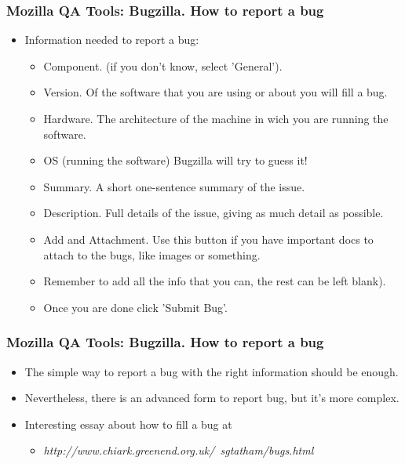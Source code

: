 \documentclass{beamer}
\begin{document}
\begin{frame}
 \frametitle{Mozilla QA Tools: Bugzilla. How to report a bug}
 \begin{itemize}
    \item Information needed to report a bug:
    \begin{itemize}
      \item Component. (if you don't know, select 'General').
      \item Version. Of the software that you are using or about you will fill a bug.
      \item Hardware. The architecture of the machine in wich you are running the software.
      \item OS (running the software) Bugzilla will try to guess it!
      \item Summary. A short one-sentence summary of the issue.
      \item Description. Full details of the issue, giving as much detail as possible.
      \item Add and Attachment. Use this button if you have important docs to attach to the bugs, like images or something.
      \item Remember to add all the info that you can, the rest can be left blank).
      \item Once you are done click 'Submit Bug'.
      \end{itemize}
 \end{itemize}
\end{frame}


\begin{frame}
 \frametitle{Mozilla QA Tools: Bugzilla. How to report a bug}
 \begin{itemize}
     \item The simple way to report a bug with the right information should be enough.
     \item Nevertheless, there is an advanced form to report bug, but it's more complex.
     \item Interesting essay about how to fill a bug at 
         \begin{itemize}
         \item \textit{http://www.chiark.greenend.org.uk/~sgtatham/bugs.html}
         \end{itemize}
 \end{itemize}
\end{frame}
\end{document}
